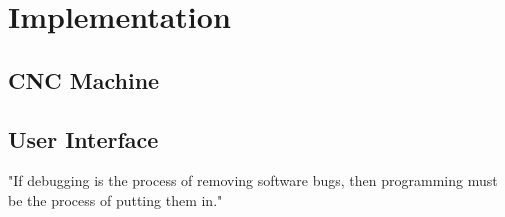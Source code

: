 \chapter{Implementation}


\section{CNC Machine}




\section{User Interface}
\begin{savequote}[75mm] 
"If debugging is the process of removing software bugs, then programming must be the process of putting them in."
\end{savequote}



